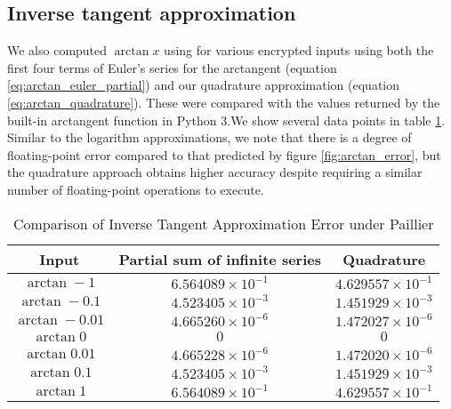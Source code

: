 \subsection{Inverse tangent approximation}
We also computed $\arctan x$ using for various encrypted inputs using both the first four terms of Euler's series for the arctangent (equation \ref{eq:arctan_euler_partial}) and our quadrature approximation (equation \ref{eq:arctan_quadrature}). These were compared with the values returned by the built-in arctangent function in Python 3.We show several data points in table \ref{tab:arctan_approximation}. Similar to the logarithm approximations, we note that there is a degree of floating-point error compared to that predicted by figure \ref{fig:arctan_error}, but the quadrature approach obtains higher accuracy despite requiring a similar number of floating-point operations to execute.

\begin{table}
	\caption{Comparison of Inverse Tangent Approximation Error under Paillier}
	\label{tab:arctan_approximation}
	\begin{tabular}{ccc}
		\toprule
		Input & Partial sum of infinite series & Quadrature\\
		\midrule
		$\arctan -1$ & $6.564089 \times 10^{-1}$ & $4.629557 \times 10^{-1}$\\
		$\arctan -0.1$ & $4.523405 \times 10^{-3}$ & $1.451929 \times 10^{-3}$\\
		$\arctan -0.01$ & $4.665260 \times 10^{-6}$ & $1.472027 \times 10^{-6}$\\
		$\arctan 0$ & $0$ & $0$\\
		$\arctan 0.01$ & $4.665228 \times 10^{-6}$ & $1.472020 \times 10^{-6}$\\
		$\arctan 0.1$ & $4.523405 \times 10^{-3} $ & $1.451929 \times 10^{-3}$\\
		$\arctan 1$ & $6.564089 \times 10^{-1} $ & $4.629557 \times 10^{-1}$\\
	\bottomrule
\end{tabular}
\end{table}
